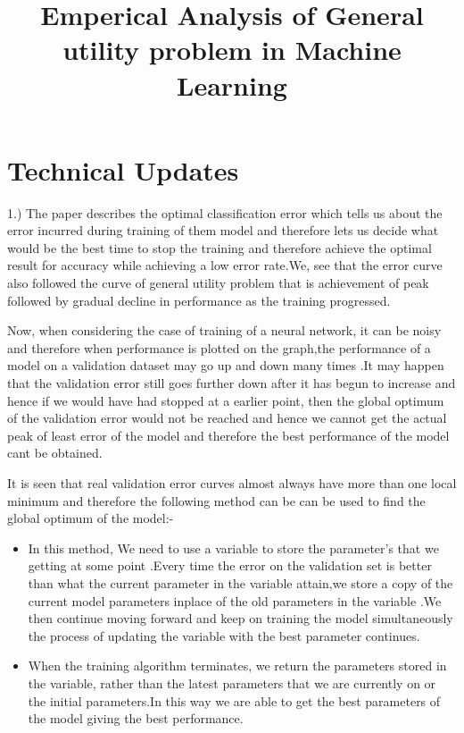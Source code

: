 \documentclass{bmvc2k}
\title{Emperical Analysis of General utility problem in Machine Learning}
\begin{document}
\maketitle


\section{Technical Updates}
1.) The paper describes the optimal classification error which tells us about the error incurred during training of them model and therefore lets us decide what would be the best time to stop the training and therefore achieve the optimal result for accuracy  while achieving a low error rate.We, see that the error curve also followed the curve of general utility problem that is achievement of peak followed by gradual decline in performance as the training progressed.\par
Now, when considering the case of  training of a neural network, it can be noisy and therefore when performance is plotted on the graph,the performance of a model on a validation dataset may go up and down many times .It may happen that the validation error still goes further down after it has begun to increase and hence if we would have had stopped at a earlier point, then the global optimum of the validation error would not be reached and hence we cannot get the actual peak of least error of the model and therefore the best performance of the model cant be obtained.\par
It is seen that real validation error curves almost always have more than one local minimum and therefore the following method can be can be used to find the global optimum of the model:-
\begin{enumerate}
\end{enumerate}
\begin{itemize}
\item In this method, We need to use a  variable  to store the parameter's that we getting at some point .Every time the error on the validation set is better than what the current parameter in the variable attain,we store a copy of the current model parameters inplace of the old parameters in the variable .We then continue moving forward and keep on training the model simultaneously the process of updating the variable with the best parameter continues.
\item  When the training algorithm terminates, we return the parameters stored in the variable, rather than the latest parameters that we are currently on or the initial parameters.In this way we are able to get the best parameters of the model giving the best performance.
\end{itemize}
\end{document}

